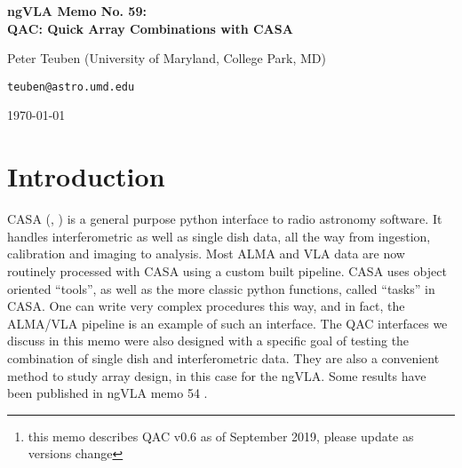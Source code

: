 \documentclass[12pt,a4paper]{article}
\begin{document}
\pagestyle{plain}
 

\begin{center}
  {\Large{\bf{ngVLA Memo No. 59: \\ QAC: Quick Array Combinations with CASA}}}
\end{center}

\bigskip

\centerline{Peter Teuben (University of Maryland, College Park, MD)}
\centerline{{\tt teuben@astro.umd.edu}}

\centerline{\today}
\bigskip


\begin{abstract}

QAC is a simple python layer in CASA, developed to aid in writing
scripts for array (single dish and interferometric) combinations and
simulations. Although initially developed for TP2VIS, running
simulations and comparing with other array combination methods, this
package turned out to be useful for array design studies as well. Both
ALMA and ngVLA simulations are already supported, but extending
to more generic arrays is straightforward.
This memo complements ngVLA memo 54,
where QAC V0.3\footnote{this memo describes QAC v0.6 as of September 2019,
please update as versions change}
was used for an array design study. QAC is probably less useful for
real data, where more CASA flexibility might be needed,
but does contain some useful functions that do not depend on the
simulation environment.


\end{abstract}




\section{Introduction}

CASA (\cite{casa1}, \cite{casa2}) 
is a general purpose python interface to radio
astronomy software. It handles interferometric as well as single dish
data, all the way from ingestion, calibration and imaging to
analysis. Most ALMA and VLA data are now routinely processed with CASA
using a custom built pipeline.  CASA uses object oriented
``tools'', as well as the more classic python functions, called
``tasks'' in CASA. One can write very complex procedures this way, and in fact, the
ALMA/VLA pipeline is an example of such an interface. The QAC
interfaces we discuss in this memo were also designed with a specific
goal of testing the combination of single dish and interferometric data. They
are also a convenient method to study array design, in this case for the ngVLA.
Some results have been published in ngVLA memo 54 \citep{memo54}.
\end{document}
